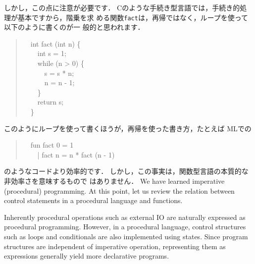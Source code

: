 \documentclass{jbook}
\newcommand{\myem}{\mbox{\ \ }}
\begin{document}
	しかし，この点に注意が必要です．
	Cのような手続き型言語では，手続き的処理が基本ですから，階乗を求
める関数{\tt fact}は，再帰ではなく，ループを使って以下のように書くのが一
般的と思われます．
\begin{tt}
\begin{quote}
\myem int fact (int n) \{\\
\myem\myem   int s = 1;\\
\myem\myem   while (n > 0) \{\\
\myem\myem\myem     s = s * n;\\
\myem\myem\myem     n = n - 1;\\
\myem\myem   \}\\
\myem\myem  return s;\\
\myem \}
\end{quote}
\end{tt}
	このようにループを使って書くほうが，再帰を使った書き方，たとえば
MLでの
\begin{tt}
\begin{quote}
\myem fun fact 0 = 1\\
\myem \ \ | fact n = n * fact (n - 1)
\end{quote}
\end{tt}
のようなコードより効率的です．
	しかし，この事実は，関数型言語の本質的な非効率さを意味するもので
はありません．
\else%
	We have learned imperative (procedural) programming.
	At this point, let us review the relation between control
statements in a procedural language and functions. 

	Inherently procedural operations such as external IO are
naturally expressed as procedural programming.
	However, in a procedural language, control structures such as
loops and conditionals are also implemented using states. 
	Since program structures are independent of imperative
operation, representing them as expressions generally yield more
declarative programs.
\end{document}

